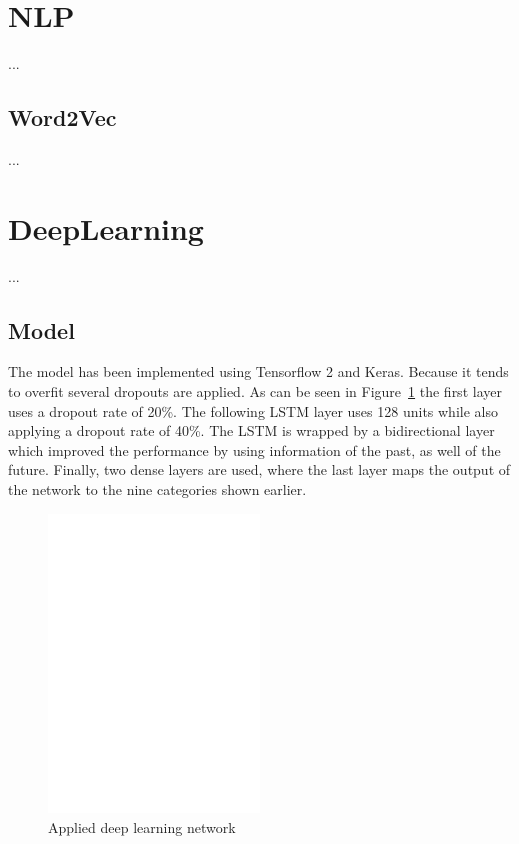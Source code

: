 \documentclass[11pt,a4paper]{article}
\begin{document}
\section{NLP}

...


\subsection{Word2Vec}

...%


\section{DeepLearning}

...


\subsection{Model}
The model has been implemented using Tensorflow 2 and Keras. Because it tends to overfit several dropouts are applied. As can be seen in Figure~\ref{fig:model} the first layer uses a dropout rate of 20\%. The following LSTM layer uses 128 units while also applying a dropout rate of 40\%. The LSTM is wrapped by a bidirectional layer which improved the performance by using information of the past, as well of the future. Finally, two dense layers are used, where the last layer maps the output of the network to the nine categories shown earlier.

\begin{figure}[h!]
	\centering
	\includegraphics[trim={1cm 19.5cm 5cm 3cm},clip,page=2, width=0.5\textwidth]{img/model}
	\caption{Applied deep learning network}
	\label{fig:model}
\end{figure}
\end{document}
